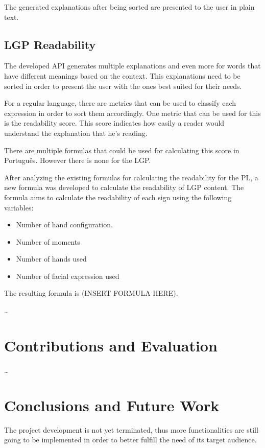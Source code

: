 \documentclass[runningheads]{llncs}
\begin{document}
The generated explanations after being sorted are presented to the user in plain text.

\subsection{LGP Readability}

The developed API generates multiple explanations and even more for words that have different meanings based on the context.
This explanations need to be sorted in order to present the user with the ones best suited for their needs.

For a regular language, there are metrics that can be used to classify each expression in order to sort them accordingly.
One metric that can be used for this is the readability score.
This score indicates how easily a reader would understand the explanation that he's reading.

There are multiple formulas that could be used for calculating this score in Português.
However there is none for the LGP.

After analyzing the existing formulas for calculating the readability for the PL, a new formula was developed to calculate the readability of LGP content.
The formula aims to calculate the readability of each sign using the following variables:

\begin{itemize}
    \item Number of hand configuration.
    \item Number of moments
    \item Number of hands used
    \item Number of facial expression used
\end{itemize}

The resulting formula is (INSERT FORMULA HERE).

\dots

\section{Contributions and Evaluation}

\dots

\section{Conclusions and Future Work}

The project development is not yet terminated, thus more functionalities are still going to be implemented in order to better fulfill the need of its target audience.
\end{document}
